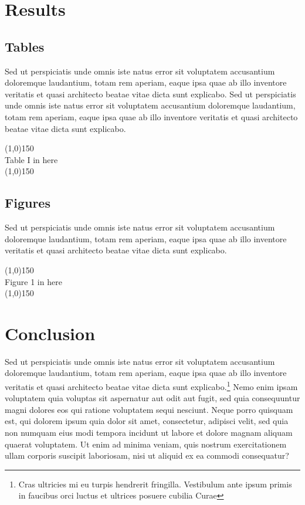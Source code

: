 \documentclass[12pt,english]{article}
\begin{document}
\section*{Results}

\subsection*{Tables}

Sed ut perspiciatis unde omnis iste natus error sit voluptatem accusantium doloremque laudantium, totam rem aperiam, eaque ipsa quae ab illo inventore veritatis et quasi architecto beatae vitae dicta sunt explicabo. Sed ut perspiciatis unde omnis iste natus error sit voluptatem accusantium doloremque laudantium, totam rem aperiam, eaque ipsa quae ab illo inventore veritatis et quasi architecto beatae vitae dicta sunt explicabo.

{\singlespacing
\begin{center}
\line(1,0){150}\\
Table I in here\\
\line(1,0){150}
\end{center}
}

\subsection*{Figures}

Sed ut perspiciatis unde omnis iste natus error sit voluptatem accusantium doloremque laudantium, totam rem aperiam, eaque ipsa quae ab illo inventore veritatis et quasi architecto beatae vitae dicta sunt explicabo.

{\singlespacing
\begin{center}
\line(1,0){150}\\
Figure 1 in here\\
\line(1,0){150}
\end{center}
}

\section*{Conclusion}

Sed ut perspiciatis unde omnis iste natus error sit voluptatem accusantium doloremque laudantium, totam rem aperiam, eaque ipsa quae ab illo inventore veritatis et quasi architecto beatae vitae dicta sunt explicabo.\footnote{Cras ultricies mi eu turpis hendrerit fringilla. Vestibulum ante ipsum primis in faucibus orci luctus et ultrices posuere cubilia Curae}  Nemo enim ipsam voluptatem quia voluptas sit aspernatur aut odit aut fugit, sed quia consequuntur magni dolores eos qui ratione voluptatem sequi nesciunt. Neque porro quisquam est, qui dolorem ipsum quia dolor sit amet, consectetur, adipisci velit, sed quia non numquam eius modi tempora incidunt ut labore et dolore magnam aliquam quaerat voluptatem. Ut enim ad minima veniam, quis nostrum exercitationem ullam corporis suscipit laboriosam, nisi ut aliquid ex ea commodi consequatur?
\end{document}
